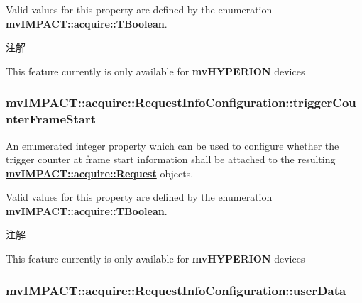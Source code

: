 Valid values for this property are defined by the enumeration {\bfseries mv\+I\+M\+P\+A\+C\+T\+::acquire\+::\+T\+Boolean}. \begin{DoxyNote}{注解}

\begin{DoxyItemize}
\item This feature currently is only available for {\bfseries mv\+H\+Y\+P\+E\+R\+I\+O\+N} devices 
\end{DoxyItemize}
\end{DoxyNote}
\hypertarget{classmv_i_m_p_a_c_t_1_1acquire_1_1_request_info_configuration_acf8e8aa2df844e3fe59683c10262af5d}{
\subsubsection[{trigger\+Counter\+Frame\+Start}]{ mv\+I\+M\+P\+A\+C\+T\+::acquire\+::\+Request\+Info\+Configuration\+::trigger\+Counter\+Frame\+Start}}\label{classmv_i_m_p_a_c_t_1_1acquire_1_1_request_info_configuration_acf8e8aa2df844e3fe59683c10262af5d}


An enumerated integer property which can be used to configure whether the trigger counter at frame start information shall be attached to the resulting {\bfseries \hyperlink{classmv_i_m_p_a_c_t_1_1acquire_1_1_request}{mv\+I\+M\+P\+A\+C\+T\+::acquire\+::\+Request}} objects. 

Valid values for this property are defined by the enumeration {\bfseries mv\+I\+M\+P\+A\+C\+T\+::acquire\+::\+T\+Boolean}. \begin{DoxyNote}{注解}

\begin{DoxyItemize}
\item This feature currently is only available for {\bfseries mv\+H\+Y\+P\+E\+R\+I\+O\+N} devices 
\end{DoxyItemize}
\end{DoxyNote}
\hypertarget{classmv_i_m_p_a_c_t_1_1acquire_1_1_request_info_configuration_a5a66a2fca455e36238a27d0e062a154c}{
\subsubsection[{user\+Data}]{ mv\+I\+M\+P\+A\+C\+T\+::acquire\+::\+Request\+Info\+Configuration\+::user\+Data}}\label{classmv_i_m_p_a_c_t_1_1acquire_1_1_request_info_configuration_a5a66a2fca455e36238a27d0e062a154c}



